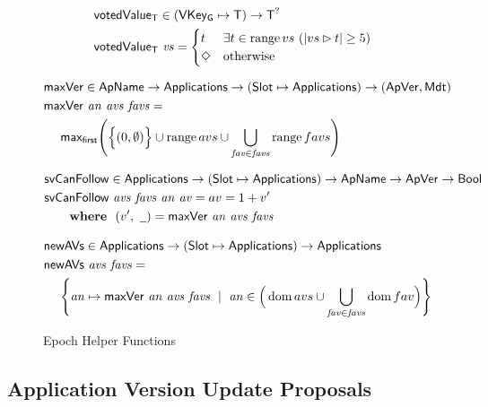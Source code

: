\begin{figure}[htb]
  \begin{align*}
      & \mathsf{votedValue_T} \in (\mathsf{VKey_G}\mapsto\mathsf{T}) \to \mathsf{T}^?\\
      & \mathsf{votedValue_T}~\mathit{vs} =
        \begin{cases}
          t & \exists t\in\operatorname{range}{vs}~(|vs\rhd t|\geq 5) \\
          \Diamond & \text{otherwise} \\
        \end{cases}
  \end{align*}

  \begin{align*}
      & \mathsf{maxVer} \in \mathsf{ApName} \to \mathsf{Applications} \to (\mathsf{Slot}\mapsto\mathsf{Applications})
        \to (\mathsf{ApVer}, \mathsf{Mdt})\\
      & \mathsf{maxVer}~\mathit{an}~\mathit{avs}~\mathit{favs} = \\
      & ~~~~\mathsf{max_{first}} \Bigg(
        \Big\{(0, \emptyset)\Big\}
        \cup
        \operatorname{range}{avs}
        \cup
        \bigcup_{\mathit{fav}\in\mathit{favs}}
        \operatorname{range}{favs}
        \Bigg)
  \end{align*}

  \begin{align*}
      & \fun{svCanFollow} \in \Applications \to (\Slot\mapsto\Applications)
        \to \ApName \to \ApVer \to \Bool\\
      & \fun{svCanFollow}~\var{avs}~\var{favs}~\var{an}~\var{av}= av = 1 + v' \\
      & ~~~~\where (v',~\wcard) = \fun{maxVer}~\var{an}~\var{avs}~\var{favs}
  \end{align*}

  \begin{align*}
      & \mathsf{newAVs} \in \mathsf{Applications} \to (\mathsf{Slot}\mapsto\mathsf{Applications}) \to \mathsf{Applications} \\
      & \mathsf{newAVs}~\mathit{avs}~\mathit{favs} = \\
      & ~~~~\Bigg\{\mathit{an}\mapsto\mathsf{maxVer}~\mathit{an}~\mathit{avs}~\mathit{favs}
            ~\mid~
            \mathit{an}\in\Big(\operatorname{dom}{avs}\cup\bigcup_{\mathit{fav}\in\mathit{favs}}\operatorname{dom}{fav}\Big)
            \Bigg\}
  \end{align*}

  \caption{Epoch Helper Functions}
  \label{fig:funcs:helper-updates}
\end{figure}

\subsection{Application Version Update Proposals}
\label{sec:app-proposals}

